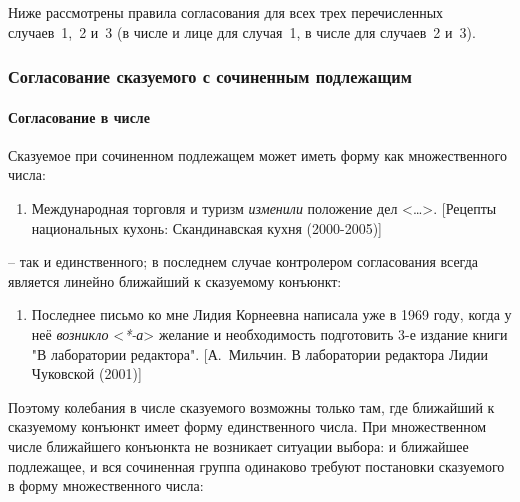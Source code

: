 Ниже рассмотрены правила согласования для всех трех перечисленных
случаев~1,~2 и~3 (в числе и лице для случая~1, в числе для случаев~2
и~3).

\subsubsection{Согласование сказуемого с сочиненным
подлежащим}\label{ux441ux43eux433ux43bux430ux441ux43eux432ux430ux43dux438ux435-ux441ux43aux430ux437ux443ux435ux43cux43eux433ux43e-ux441-ux441ux43eux447ux438ux43dux435ux43dux43dux44bux43c-ux43fux43eux434ux43bux435ux436ux430ux449ux438ux43c}

\paragraph{Согласование в
числе}\label{ux441ux43eux433ux43bux430ux441ux43eux432ux430ux43dux438ux435-ux432-ux447ux438ux441ux43bux435}

Сказуемое при сочиненном подлежащем может иметь форму как множественного
числа:

\begin{enumerate}
\def\labelenumi{(\arabic{enumi})}
\setcounter{enumi}{82}
\item
  Международная торговля и туризм \textit{изменили} положение дел
  \textless\ldots\textgreater. {[}Рецепты национальных кухонь:
  Скандинавская кухня (2000-2005){]}
\end{enumerate}

-- так и единственного; в последнем случае контролером согласования
всегда является линейно ближайший к сказуемому конъюнкт:

\begin{enumerate}
\def\labelenumi{(\arabic{enumi})}
\setcounter{enumi}{83}
\item
  Последнее письмо ко мне Лидия Корнеевна написала уже в 1969 году,
  когда у неё \textit{возникло} \textless{}\textit{*-а}\textgreater{}
  желание и необходимость подготовить 3-е издание книги "В лаборатории
  редактора". {[}А.~Мильчин. В лаборатории редактора Лидии Чуковской
  (2001){]}
\end{enumerate}

Поэтому колебания в числе сказуемого возможны только там, где ближайший
к сказуемому конъюнкт имеет форму единственного числа. При множественном
числе ближайшего конъюнкта не возникает ситуации выбора: и ближайшее
подлежащее, и вся сочиненная группа одинаково требуют постановки
сказуемого в форму множественного числа:

